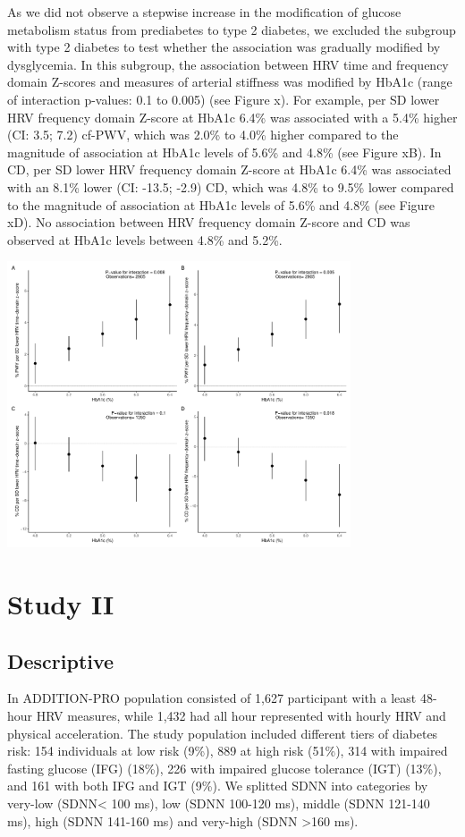 \documentclass[
  a4paper,
  headsepline=true,
  open=any]{scrbook}
\begin{document}
As we did not observe a stepwise increase in the modification of glucose
metabolism status from prediabetes to type 2 diabetes, we excluded the
subgroup with type 2 diabetes to test whether the association was
gradually modified by dysglycemia. In this subgroup, the association
between HRV time and frequency domain Z-scores and measures of arterial
stiffness was modified by HbA1c (range of interaction p-values: 0.1 to
0.005) (see Figure x). For example, per SD lower HRV frequency domain
Z-score at HbA1c 6.4\% was associated with a 5.4\% higher (CI: 3.5; 7.2)
cf-PWV, which was 2.0\% to 4.0\% higher compared to the magnitude of
association at HbA1c levels of 5.6\% and 4.8\% (see Figure xB). In CD,
per SD lower HRV frequency domain Z-score at HbA1c 6.4\% was associated
with an 8.1\% lower (CI: -13.5; -2.9) CD, which was 4.8\% to 9.5\% lower
compared to the magnitude of association at HbA1c levels of 5.6\% and
4.8\% (see Figure xD). No association between HRV frequency domain
Z-score and CD was observed at HbA1c levels between 4.8\% and 5.2\%.

\includegraphics[width=4in,height=\textheight]{images/em_hba1c.pdf}

\hypertarget{study-ii-1}{%
\section{Study II}\label{study-ii-1}}

\hypertarget{descriptive-1}{%
\subsection{Descriptive}\label{descriptive-1}}

In ADDITION-PRO population consisted of 1,627 participant with a least
48-hour HRV measures, while 1,432 had all hour represented with hourly
HRV and physical acceleration. The study population included different
tiers of diabetes risk: 154 individuals at low risk (9\%), 889 at high
risk (51\%), 314 with impaired fasting glucose (IFG) (18\%), 226 with
impaired glucose tolerance (IGT) (13\%), and 161 with both IFG and IGT
(9\%). We splitted SDNN into categories by very-low (SDNN\textless{} 100
ms), low (SDNN 100-120 ms), middle (SDNN 121-140 ms), high (SDNN 141-160
ms) and very-high (SDNN \textgreater160 ms).
\end{document}
